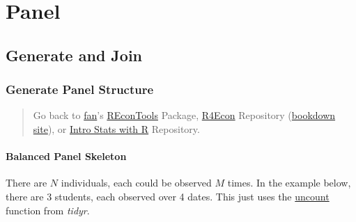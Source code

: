 \documentclass[
]{book}
\begin{document}
\hypertarget{panel}{%
\chapter{Panel}\label{panel}}

\hypertarget{generate-and-join}{%
\section{Generate and Join}\label{generate-and-join}}

\hypertarget{generate-panel-structure}{%
\subsection{Generate Panel Structure}\label{generate-panel-structure}}

\begin{quote}
Go back to \href{http://fanwangecon.github.io/}{fan}'s \href{https://fanwangecon.github.io/REconTools/}{REconTools} Package, \href{https://fanwangecon.github.io/R4Econ/}{R4Econ} Repository (\href{https://fanwangecon.github.io/R4Econ/bookdown}{bookdown site}), or \href{https://fanwangecon.github.io/Stat4Econ/}{Intro Stats with R} Repository.
\end{quote}

\hypertarget{balanced-panel-skeleton}{%
\subsubsection{Balanced Panel Skeleton}\label{balanced-panel-skeleton}}

There are \(N\) individuals, each could be observed \(M\) times. In the example below, there are 3 students, each observed over 4 dates. This just uses the \href{https://tidyr.tidyverse.org/reference/uncount.html}{uncount} function from \emph{tidyr}.
\end{document}
